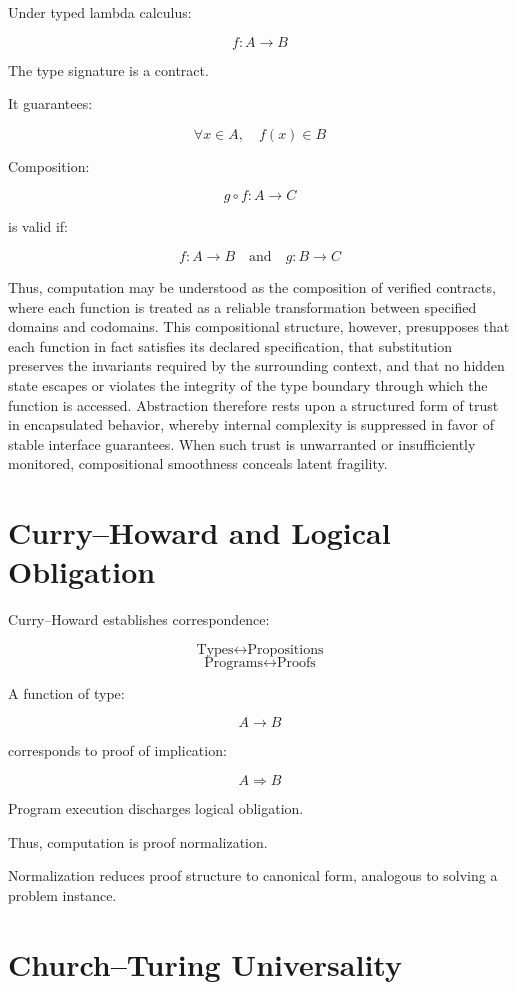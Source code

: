 \documentclass[11pt,openany]{book}
\begin{document}
Under typed lambda calculus:

\[
f : A \to B
\]

The type signature is a contract.

It guarantees:

\[
\forall x \in A, \quad f(x) \in B
\]

Composition:

\[
g \circ f : A \to C
\]

is valid if:

\[
f : A \to B \quad \text{and} \quad g : B \to C
\]

Thus, computation may be understood as the composition of verified contracts, 
where each function is treated as a reliable transformation between specified 
domains and codomains. This compositional structure, however, presupposes that 
each function in fact satisfies its declared specification, that substitution 
preserves the invariants required by the surrounding context, and that no hidden 
state escapes or violates the integrity of the type boundary through which the 
function is accessed. Abstraction therefore rests upon a structured form of 
trust in encapsulated behavior, whereby internal complexity is suppressed in 
favor of stable interface guarantees. When such trust is unwarranted or 
insufficiently monitored, compositional smoothness conceals latent fragility.

\section{Curry--Howard and Logical Obligation}

Curry--Howard establishes correspondence:

\[
\text{Types} \leftrightarrow \text{Propositions}
\]
\[
\text{Programs} \leftrightarrow \text{Proofs}
\]

A function of type:

\[
A \to B
\]

corresponds to proof of implication:

\[
A \Rightarrow B
\]

Program execution discharges logical obligation.

Thus, computation is proof normalization.

Normalization reduces proof structure to canonical form,
analogous to solving a problem instance.

\section{Church--Turing Universality}
\end{document}
